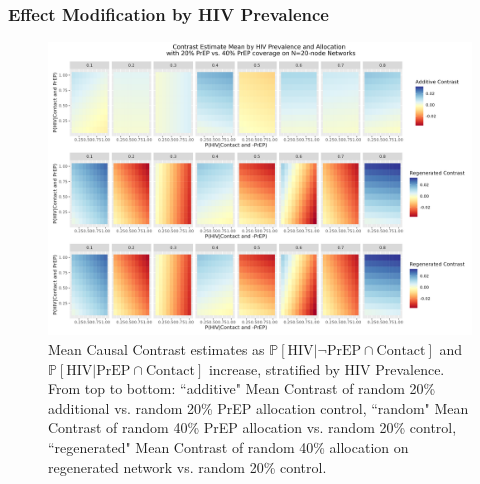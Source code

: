 \documentclass{article}
\theoremstyle{definition}
\begin{document}
\subsubsection{Effect Modification by HIV Prevalence}
\begin{figure}[H]
    \centering
    \includegraphics[width=\linewidth]{Corrected Figures/HIV Prevalence Mean Plot.png }
    \caption{Mean Causal Contrast estimates as $\mathbb{P}\left[\text{HIV} \vert \neg \text{PrEP} \cap \text{Contact}\right]$ and $\mathbb{P}\left[\text{HIV} \vert \text{PrEP} \cap \text{Contact}\right]$ increase,  stratified by HIV Prevalence. From top to bottom: ``additive" Mean Contrast of random 20\% additional vs. random 20\% PrEP allocation control, ``random" Mean Contrast of random 40\% PrEP allocation vs. random 20\% control, ``regenerated" Mean Contrast of random 40\% allocation on regenerated network vs. random 20\% control.}
    \label{fig:Figure S4.5}
\end{figure}
\end{document}
